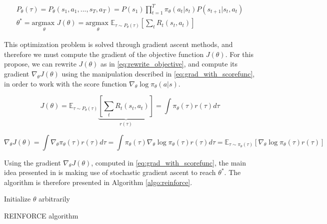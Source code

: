 \begin{align}
P_{\theta}(\tau) = P_{\theta}(s_1,a_1,...,s_T,a_T) = P(s_1)\prod_{t=1}^T{\pi_{\theta}(a_t|s_t) P(s_{t+1}|s_t,a_t)} 
\label{eq:tau_def}
\\
\theta^* = \underset{\theta}{\textrm{argmax }} J(\theta) =
\underset{\theta}{\textrm{argmax }} \mathbb{E}_{\tau \sim P_{\theta}(\tau)} \left[ \sum_t{R_t(s_t,a_t)} \right]
\label{eq:theta_max}
\end{align}

This optimization problem is solved through gradient ascent methods, and therefore we must compute the gradient of the objective function $J(\theta)$. For this propose, we can rewrite $J(\theta)$ as in \ref{eq:rewrite_objective}, and compute its gradient $\nabla_{\theta} J(\theta)$ using the manipulation described in \ref{eq:grad_with_scorefunc}, in order to work with the score function $\nabla_{\theta}\log{\pi_{\theta}(a|s)}$.

\begin{equation}
J(\theta) = \mathbb{E}_{\tau \sim P_{\theta}(\tau)} \underbrace{ \left[ \sum_t{R_t(s_t,a_t)} \right] }_{r(\tau)} = \int{\pi_{\theta}(\tau)r(\tau)d \tau}
\label{eq:rewrite_objective}
\end{equation}

\begin{equation}
\nabla_{\theta} J(\theta) = \int{\nabla_{\theta} \pi_{\theta}(\tau)r(\tau)d \tau} = 
\int{\pi_{\theta}(\tau) \nabla_{\theta} \log{\pi_{\theta}(\tau)} r(\tau)d \tau} =
\mathbb{E}_{\tau \sim \pi_{\theta}(\tau)} \left[ \nabla_{\theta} \log{\pi_{\theta}(\tau)} r(\tau) \right]
\label{eq:grad_with_scorefunc}
\end{equation}

Using the gradient $\nabla_{\theta} J(\theta)$, computed in \ref{eq:grad_with_scorefunc}, the main idea presented in \cite{REINFORCE} is making use of stochastic gradient ascent to reach $\theta^*$. The algorithm is therefore presented in Algorithm \ref{algo:reinforce}.

\begin{algorithm}[H]
    \DontPrintSemicolon
    \SetAlgoLined
    Initialize $\theta$ arbitrarily\;
    \Return{$\theta$}
    \caption{REINFORCE algorithm}
    \label{algo:reinforce}
\end{algorithm}

